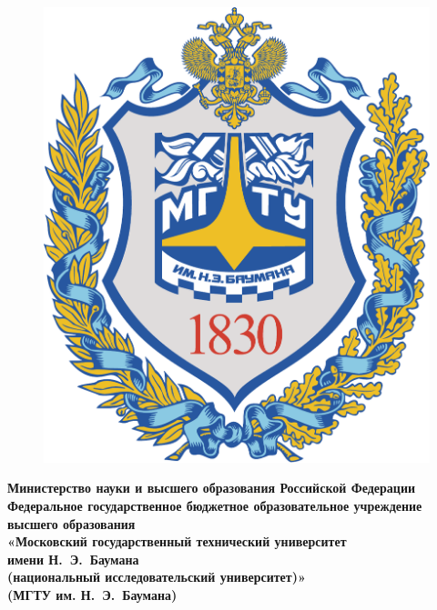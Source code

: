 \begin{FixLineStretch}[1.25]
\begin{titlepage}
	\centering

	\begin{figure}
		\vspace{5mm}
		\hspace{-8mm}
		\includegraphics[width=0.89\linewidth]{inc/img/bmstu-logo}
	\end{figure}

	{\singlespacing\footnotesize\bfseries
		Министерство науки и высшего образования Российской Федерации \\
		Федеральное государственное бюджетное образовательное учреждение \\
		высшего образования \\
		«Московский государственный технический университет \\
		имени Н.~Э.~Баумана \\
		(национальный исследовательский университет)» \\
		(МГТУ им. Н.~Э.~Баумана) \\
	}

	\vspace{-2.2mm}
	\vhrulefill{0.9mm} \\
	\vspace{-7mm}
	\vhrulefill{0.2mm} \\
	\vspace{2mm}


\end{titlepage}
\end{FixLineStretch}
